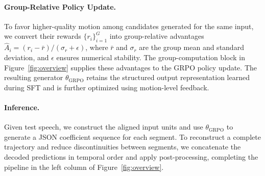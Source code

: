 \paragraph{Group-Relative Policy Update.}
To favor higher-quality motion among candidates generated for the same input, we convert their rewards $\{r_i\}_{i=1}^{G}$ into group-relative advantages $\hat{A}_i=(r_i-\bar{r})/(\sigma_r+\epsilon)$, where $\bar{r}$ and $\sigma_r$ are the group mean and standard deviation, and $\epsilon$ ensures numerical stability.
The group-computation block in Figure~\ref{fig:overview} supplies these advantages to the GRPO policy update.
The resulting generator $\theta_{\mathrm{GRPO}}$ retains the structured output representation learned during SFT and is further optimized using motion-level feedback.

\paragraph{Inference.}
Given test speech, we construct the aligned input units and use $\theta_{\mathrm{GRPO}}$ to generate a JSON coefficient sequence for each segment.
To reconstruct a complete trajectory and reduce discontinuities between segments, we concatenate the decoded predictions in temporal order and apply post-processing, completing the pipeline in the left column of Figure~\ref{fig:overview}.
